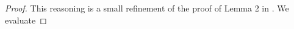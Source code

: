 \documentclass{article}
\begin{document}
\begin{proof}%
  This reasoning is a small refinement of the proof of Lemma 2 in \cite{syrgkanis2016improved}. We evaluate



\end{proof}
\end{document}
